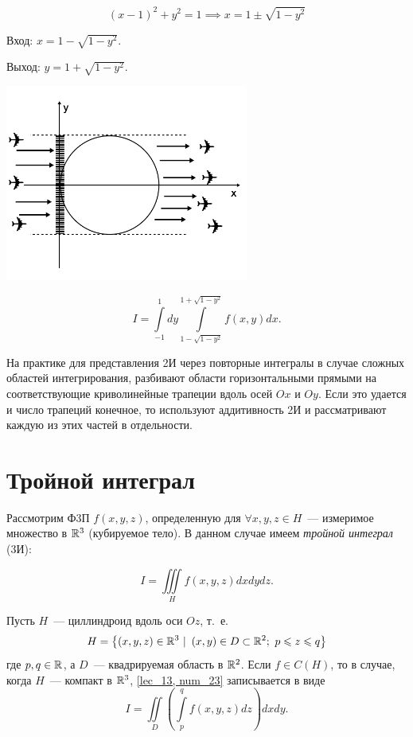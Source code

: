 \documentclass[../../main.tex]{subfiles}
\begin{document}
\begin{exmp}
\begin{enumerate}
		\[ \left( x - 1 \right)^2 + y^2 = 1 \implies x = 1 \pm \sqrt{1 - y^2} \]
		
		Вход: $ x = 1 - \sqrt{1 - y^2 }$.
		
		Выход: $ y = 1 + \sqrt{1 - y^2 } $.
		
		\begin{center}
			\includegraphics[width=0.6\textwidth]{lec13_circle_case2.png}
		\end{center}
		
		\[ I = \int\limits_{-1}^1 dy \int\limits_{1 - \sqrt{1 - y^2}} ^ 
		{1 + \sqrt{1 - y^2}} f \left( x, y\right) dx. \]
	\end{enumerate}
\end{exmp}

На практике для представления 2И через повторные интегралы
в случае
сложных областей интегрирования, разбивают области горизонтальными
прямыми на соответствующие криволинейные трапеции вдоль осей $Ox$ и $Oy$.
Если это удается
и число трапеций конечное, то используют аддитивность 2И и рассматривают
каждую из этих частей в отдельности.

\section{Тройной интеграл }

Рассмотрим Ф3П $ f \left( x, y, z \right)$, определенную для 
$\forall x, y, z \in H $~--- измеримое множество в $ \mathbb{R}^3 $
(кубируемое тело). В данном случае имеем \emph{тройной интеграл} (3И):

\begin{equation}
\label{lec_13, num_23}
I = \iiint\limits_{H} f \left( x, y, z \right) dx dy dz.
\end{equation}

\begin{thm}
	Пусть $ H $~--- циллиндроид вдоль оси $ Oz $, т.~е. 
	\begin{equation}
	\label{lec_13, num_24}
	H = \left\lbrace \left( x, y, z \right) \in \mathbb{R}^3\ |
	\ \left( x, y \right) \in D \subset \mathbb{R}^2;\ p \leqslant z \leqslant q \right\rbrace
	\end{equation}
	где $ p, q \in \mathbb{R} $, а $ D $~--- квадрируемая область в $ \mathbb{R}^2 $.
	Если $f \in C(H)$, то в случае, когда $H$~--- компакт 
	в $\mathbb{R}^3$, \eqref {lec_13, num_23} записывается в виде
	\begin{equation}
	\label{lec_13, num_25}
	I = \iint\limits_D \left( \int\limits_p^q 
	f \left( x, y, z \right) dz \right) dx dy.
	\end{equation}
\end{thm}
\end{document}

